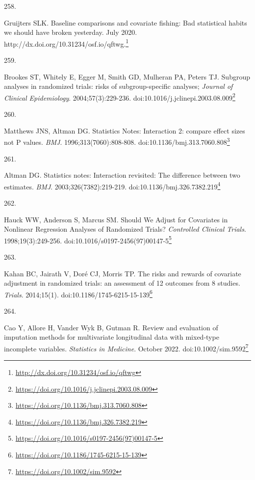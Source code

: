 \documentclass[
  a4paper,
]{book}
\newlength{\cslhangindent}
\newlength{\csllabelwidth}
\newlength{\cslentryspacingunit} %
\newenvironment{CSLReferences}[2] %
 {%
  \setlength{\parindent}{0pt}
  \ifodd #1
  \let\oldpar\par
  \def\par{\hangindent=\cslhangindent\oldpar}
  \fi
  \setlength{\parskip}{#2\cslentryspacingunit}
 }%
 {}
\newcommand{\CSLLeftMargin}[1]{\parbox[t]{\csllabelwidth}{#1}}
\newcommand{\CSLRightInline}[1]{\parbox[t]{\linewidth - \csllabelwidth}{#1}\break}
\renewcommand{\href}[2]{#2\footnote{\url{#1}}}
\begin{document}
\begin{CSLReferences}{0}{0}
\leavevmode{}%
\CSLLeftMargin{258. }%
\CSLRightInline{Gruijters SLK. Baseline comparisons and covariate fishing: Bad statistical habits we should have broken yesterday. July 2020. \href{http://dx.doi.org/10.31234/osf.io/qftwg}{http://dx.doi.org/10.31234/osf.io/qftwg.}}

\leavevmode{}%
\CSLLeftMargin{259. }%
\CSLRightInline{Brookes ST, Whitely E, Egger M, Smith GD, Mulheran PA, Peters TJ. Subgroup analyses in randomized trials: risks of subgroup-specific analyses; \emph{Journal of Clinical Epidemiology}. 2004;57(3):229-236. doi:\href{https://doi.org/10.1016/j.jclinepi.2003.08.009}{10.1016/j.jclinepi.2003.08.009}}

\leavevmode{}%
\CSLLeftMargin{260. }%
\CSLRightInline{Matthews JNS, Altman DG. Statistics Notes: Interaction 2: compare effect sizes not P values. \emph{BMJ}. 1996;313(7060):808-808. doi:\href{https://doi.org/10.1136/bmj.313.7060.808}{10.1136/bmj.313.7060.808}}

\leavevmode{}%
\CSLLeftMargin{261. }%
\CSLRightInline{Altman DG. Statistics notes: Interaction revisited: The difference between two estimates. \emph{BMJ}. 2003;326(7382):219-219. doi:\href{https://doi.org/10.1136/bmj.326.7382.219}{10.1136/bmj.326.7382.219}}

\leavevmode{}%
\CSLLeftMargin{262. }%
\CSLRightInline{Hauck WW, Anderson S, Marcus SM. Should We Adjust for Covariates in Nonlinear Regression Analyses of Randomized Trials? \emph{Controlled Clinical Trials}. 1998;19(3):249-256. doi:\href{https://doi.org/10.1016/s0197-2456(97)00147-5}{10.1016/s0197-2456(97)00147-5}}

\leavevmode{}%
\CSLLeftMargin{263. }%
\CSLRightInline{Kahan BC, Jairath V, Doré CJ, Morris TP. The risks and rewards of covariate adjustment in randomized trials: an assessment of 12 outcomes from 8 studies. \emph{Trials}. 2014;15(1). doi:\href{https://doi.org/10.1186/1745-6215-15-139}{10.1186/1745-6215-15-139}}

\leavevmode{}%
\CSLLeftMargin{264. }%
\CSLRightInline{Cao Y, Allore H, Vander Wyk B, Gutman R. Review and evaluation of imputation methods for multivariate longitudinal data with mixed{-}type incomplete variables. \emph{Statistics in Medicine}. October 2022. doi:\href{https://doi.org/10.1002/sim.9592}{10.1002/sim.9592}}


\end{CSLReferences}
\end{document}
